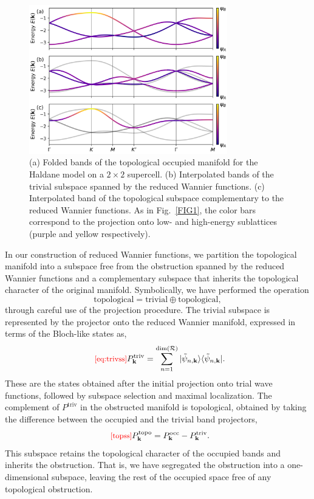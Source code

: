 \documentclass[galley,aps,pra,10pt,amsmath,amssymb,
    superscriptaddress,nofootinbib,longbibliography]{revtex4-2}
\def\Red#1{\textcolor{red}{#1}}
\newcounter{comm}
\newcommand{\eqlab}[1]{\Red{\hbox{\small\;\;[#1]}}\label{eq:#1}}
\newcommand{\eqlab}[1]{\label{eq:#1}}
\begin{document}
\begin{figure}[t!]
\begin{center}
\includegraphics[width=3.4in]{fig5.png}
\end{center}
\vspace{-5mm}
\caption{(a) Folded bands of the topological occupied manifold for the Haldane model on a $2\times 2$ supercell. (b) Interpolated bands of the trivial subspace spanned by the reduced Wannier functions. (c) Interpolated band of the topological subspace complementary to the reduced Wannier functions. As in Fig.~\ref{FIG1}, the color bars correspond to the projection onto low- and high-energy sublattices (purple and yellow respectively).}
\label{FIG5}
\end{figure}

In our construction of reduced Wannier functions, we partition the topological manifold into a subspace free from the obstruction spanned by the reduced Wannier functions and a complementary subspace that inherits the topological character of the original manifold. Symbolically, we have performed the operation
\begin{equation}
    \text{topological} = \text{trivial} \oplus \text{topological},
\end{equation}
through careful use of the projection procedure. The trivial subspace is represented by the projector onto the reduced Wannier manifold, expressed in terms of the Bloch-like states as, 
\begin{equation}
\eqlab{eq:trivss}
    P^{\text{triv}}_{\mathbf{k}} = \sum_{n=1}^{\dim({\mathcal{R}})} |\tilde{\psi}_{n,\mathbf{k}} \rangle \langle \tilde{\psi}_{n,\mathbf{k}}|.
\end{equation}
These are the states obtained after the initial projection onto trial wave functions, followed by subspace selection and maximal localization. The complement of $P^{\text{triv}}$ in the obstructed manifold is topological, obtained by taking the difference between the occupied and the trivial band projectors, 
\begin{equation}
\eqlab{topss}
P^{\text{topo}}_{\mathbf{k}}= P^{\text{occ}}_{\mathbf{k}} - P^{\text{triv}}_{\mathbf{k}}.
\end{equation}
This subspace retains the topological character of the occupied bands and inherits the obstruction. That is, we have segregated the obstruction into a one-dimensional subspace, leaving the rest of the occupied space free of any topological obstruction.
\end{document}
